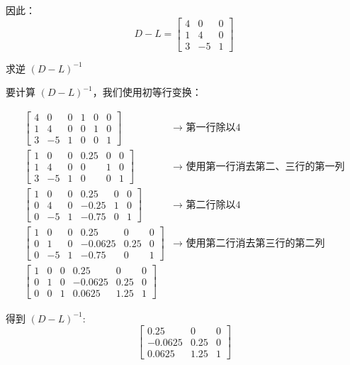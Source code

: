 \begin{tcolorbox}[enhanced,colback=10,colframe=9,breakable,coltitle=green!25!black,title=2024]
因此：
$$
D-L = \begin{bmatrix}
4 & 0 & 0 \\
1 & 4 & 0 \\
3 & -5 & 1
\end{bmatrix}
$$

 求逆 $(D-L)^{-1}$

要计算 $(D-L)^{-1}$，我们使用初等行变换：

$$
\begin{aligned}
\left[\begin{array}{ccc|ccc}
4 & 0 & 0 & 1 & 0 & 0 \\
1 & 4 & 0 & 0 & 1 & 0 \\
3 & -5 & 1 & 0 & 0 & 1
\end{array}\right] & \rightarrow \text{ 第一行除以4} \\
\left[\begin{array}{ccc|ccc}
1 & 0 & 0 & 0.25 & 0 & 0 \\
1 & 4 & 0 & 0 & 1 & 0 \\
3 & -5 & 1 & 0 & 0 & 1
\end{array}\right] & \rightarrow \text{ 使用第一行消去第二、三行的第一列} \\
\left[\begin{array}{ccc|ccc}
1 & 0 & 0 & 0.25 & 0 & 0 \\
0 & 4 & 0 & -0.25 & 1 & 0 \\
0 & -5 & 1 & -0.75 & 0 & 1
\end{array}\right] & \rightarrow \text{ 第二行除以4} \\
\left[\begin{array}{ccc|ccc}
1 & 0 & 0 & 0.25 & 0 & 0 \\
0 & 1 & 0 & -0.0625 & 0.25 & 0 \\
0 & -5 & 1 & -0.75 & 0 & 1
\end{array}\right] & \rightarrow \text{ 使用第二行消去第三行的第二列} \\
\left[\begin{array}{ccc|ccc}
1 & 0 & 0 & 0.25 & 0 & 0 \\
0 & 1 & 0 & -0.0625 & 0.25 & 0 \\
0 & 0 & 1 & 0.0625 & 1.25 & 1
\end{array}\right] & 
\end{aligned}
$$

得到 $(D-L)^{-1}$:
$$
\begin{bmatrix}
0.25 & 0 & 0 \\
-0.0625 & 0.25 & 0 \\
0.0625 & 1.25 & 1
\end{bmatrix}
$$


\end{tcolorbox}
